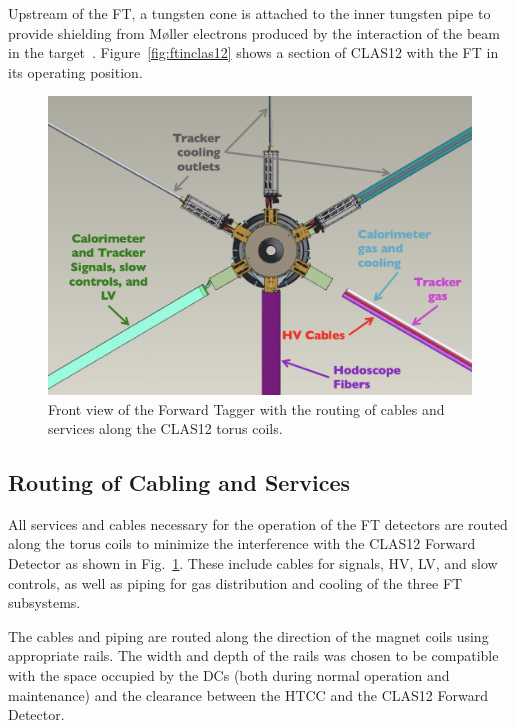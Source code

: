 Upstream of the FT, a tungsten cone is attached to the inner tungsten pipe to provide shielding from M{\o}ller
electrons produced by the interaction of the beam in the target~\cite{beamline}. Figure~\ref{fig:ftinclas12} shows a
section of CLAS12 with the FT in its operating position.

\begin{figure}
\includegraphics[width=1.0\columnwidth]{./fig/ft_cables.png}
\caption{Front view of the Forward Tagger with the routing of cables and services along the CLAS12 torus coils.}
\label{fig:integra}
\end{figure}

\subsection{Routing of Cabling and Services}

All services and cables necessary for the operation of the FT detectors are routed along the torus coils to minimize
the interference with the CLAS12 Forward Detector as shown in Fig.~\ref{fig:integra}. These include cables for
signals, HV, LV, and slow controls, as well as piping for gas distribution and cooling of the three FT subsystems.

The cables and piping are routed along the direction of the magnet coils using appropriate rails. The
width and depth of the rails was chosen to be compatible with the space occupied by the DCs (both during
normal operation and maintenance) and the clearance between the HTCC and the CLAS12 Forward Detector.
